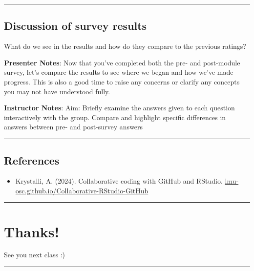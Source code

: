 \documentclass[
  letterpaper,
  DIV=11,
  numbers=noendperiod]{scrartcl}
\providecommand{\tightlist}{%
  \setlength{\itemsep}{0pt}\setlength{\parskip}{0pt}}
\begin{document}
\begin{center}\rule{0.5\linewidth}{0.5pt}\end{center}

\subsection{Discussion of survey
results}\label{discussion-of-survey-results-1}

What do we see in the results and how do they compare to the previous
ratings?

\textbf{Presenter Notes}: Now that you've completed both the pre- and
post-module survey, let's compare the results to see where we began and
how we've made progress. This is also a good time to raise any concerns
or clarify any concepts you may not have understood fully.

\textbf{Instructor Notes}: Aim: Briefly examine the answers given to
each question interactively with the group. Compare and highlight
specific differences in answers between pre- and post-survey answers

\begin{center}\rule{0.5\linewidth}{0.5pt}\end{center}

\subsection{References}\label{references}

\begin{itemize}
\tightlist
\item
  Krystalli, A. (2024). Collaborative coding with GitHub and RStudio.
  \href{https://lmu-osc.github.io/Collaborative-RStudio-GitHub/}{lmu-osc.github.io/Collaborative-RStudio-GitHub}
\end{itemize}

\begin{center}\rule{0.5\linewidth}{0.5pt}\end{center}

\section{\texorpdfstring{Thanks! }{Thanks!  }}\label{thanks}

See you next class :)

\begin{center}\rule{0.5\linewidth}{0.5pt}\end{center}
\end{document}
